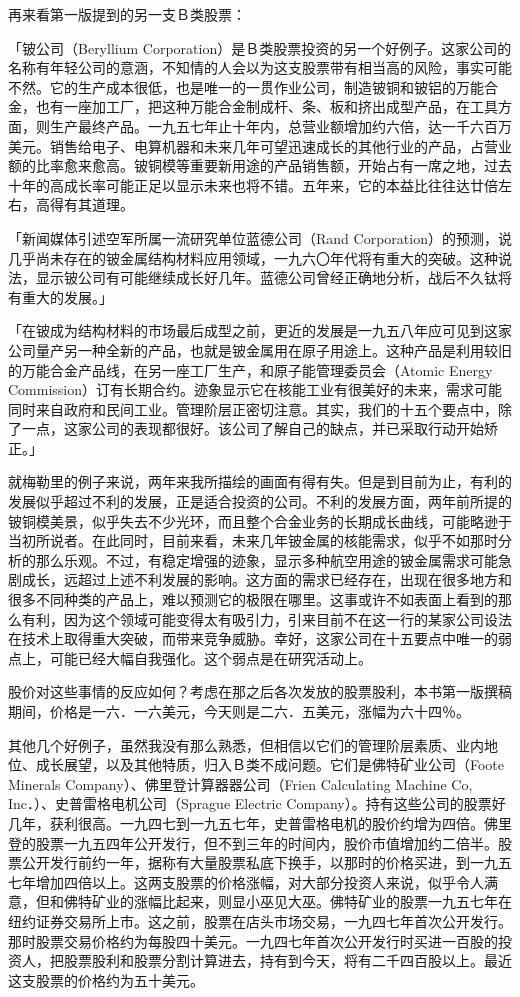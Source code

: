 \documentclass[UTF8,a4paper,zihao=-4,fontset = windows]{ctexart} %
\begin{document}
再来看第一版提到的另一支Ｂ类股票：



「铍公司（Beryllium Corporation）是Ｂ类股票投资的另一个好例子。这家公司的名称有年轻公司的意涵，不知情的人会以为这支股票带有相当高的风险，事实可能不然。它的生产成本很低，也是唯一的一贯作业公司，制造铍铜和铍铝的万能合金，也有一座加工厂，把这种万能合金制成杆、条、板和挤出成型产品，在工具方面，则生产最终产品。一九五七年止十年内，总营业额增加约六倍，达一千六百万美元。销售给电子、电算机器和未来几年可望迅速成长的其他行业的产品，占营业额的比率愈来愈高。铍铜模等重要新用途的产品销售额，开始占有一席之地，过去十年的高成长率可能正足以显示未来也将不错。五年来，它的本益比往往达廿倍左右，高得有其道理。

「新闻媒体引述空军所属一流研究单位蓝德公司（Rand Corporation）的预测，说几乎尚未存在的铍金属结构材料应用领域，一九六〇年代将有重大的突破。这种说法，显示铍公司有可能继续成长好几年。蓝德公司曾经正确地分析，战后不久钛将有重大的发展。」

「在铍成为结构材料的市场最后成型之前，更近的发展是一九五八年应可见到这家公司量产另一种全新的产品，也就是铍金属用在原子用途上。这种产品是利用较旧的万能合金产品线，在另一座工厂生产，和原子能管理委员会（Atomic Energy　Commission）订有长期合约。迹象显示它在核能工业有很美好的未来，需求可能同时来自政府和民间工业。管理阶层正密切注意。其实，我们的十五个要点中，除了一点，这家公司的表现都很好。该公司了解自己的缺点，并已采取行动开始矫正。」

就梅勒里的例子来说，两年来我所描绘的画面有得有失。但是到目前为止，有利的发展似乎超过不利的发展，正是适合投资的公司。不利的发展方面，两年前所提的铍铜模美景，似乎失去不少光环，而且整个合金业务的长期成长曲线，可能略逊于当初所说者。在此同时，目前来看，未来几年铍金属的核能需求，似乎不如那时分析的那么乐观。不过，有稳定增强的迹象，显示多种航空用途的铍金属需求可能急剧成长，远超过上述不利发展的影响。这方面的需求已经存在，出现在很多地方和很多不同种类的产品上，难以预测它的极限在哪里。这事或许不如表面上看到的那么有利，因为这个领域可能变得太有吸引力，引来目前不在这一行的某家公司设法在技术上取得重大突破，而带来竞争威胁。幸好，这家公司在十五要点中唯一的弱点上，可能已经大幅自我强化。这个弱点是在研究活动上。

股价对这些事情的反应如何？考虑在那之后各次发放的股票股利，本书第一版撰稿期间，价格是一六．一六美元，今天则是二六．五美元，涨幅为六十四％。

其他几个好例子，虽然我没有那么熟悉，但相信以它们的管理阶层素质、业内地位、成长展望，以及其他特质，归入Ｂ类不成问题。它们是佛特矿业公司（Foote Minerals Company）、佛里登计算器器公司（Frien Calculating Machine Co, Inc．）、史普雷格电机公司（Sprague Electric Company）。持有这些公司的股票好几年，获利很高。一九四七到一九五七年，史普雷格电机的股价约增为四倍。佛里登的股票一九五四年公开发行，但不到三年的时间内，股价市值增加约二倍半。股票公开发行前约一年，据称有大量股票私底下换手，以那时的价格买进，到一九五七年增加四倍以上。这两支股票的价格涨幅，对大部分投资人来说，似乎令人满意，但和佛特矿业的涨幅比起来，则显小巫见大巫。佛特矿业的股票一九五七年在纽约证券交易所上市。这之前，股票在店头市场交易，一九四七年首次公开发行。那时股票交易价格约为每股四十美元。一九四七年首次公开发行时买进一百股的投资人，把股票股利和股票分割计算进去，持有到今天，将有二千四百股以上。最近这支股票的价格约为五十美元。
\end{document}
